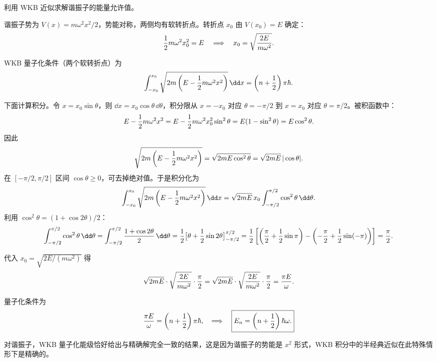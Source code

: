 \begin{question}
利用 WKB 近似求解谐振子的能量允许值。
\end{question}
\begin{solution}
谐振子势为 $V(x)=m\omega^2x^2/2$，势能对称，两侧均有软转折点。转折点 $x_0$ 由 $V(x_0)=E$ 确定：
\[
{1\over2}m\omega^2x_0^2=E\quad\Longrightarrow\quad
x_0=\sqrt{2E\over m\omega^2}.
\]

WKB 量子化条件（两个软转折点）为
\[
\int_{-x_0}^{x_0}\sqrt{2m\left(E-{1\over2}m\omega^2x^2\right)}\,\dd x
=\left(n+{1\over2}\right)\pi\hbar.
\]

下面计算积分。令 $x=x_0\sin\theta$，则 $\dd x=x_0\cos\theta\,\dd\theta$，积分限从 $x=-x_0$ 对应 $\theta=-\pi/2$ 到 $x=x_0$ 对应 $\theta=\pi/2$。被积函数中：
\[
E-{1\over2}m\omega^2x^2
=E-{1\over2}m\omega^2x_0^2\sin^2\theta
=E(1-\sin^2\theta)=E\cos^2\theta.
\]
因此
\[
\sqrt{2m\left(E-{1\over2}m\omega^2x^2\right)}
=\sqrt{2mE\cos^2\theta}=\sqrt{2mE}\,|\cos\theta|.
\]
在 $[-\pi/2,\pi/2]$ 区间 $\cos\theta\ge0$，可去掉绝对值。于是积分化为
\[
\int_{-x_0}^{x_0}\sqrt{2m\left(E-{1\over2}m\omega^2x^2\right)}\,\dd x
=\sqrt{2mE}\,x_0\int_{-\pi/2}^{\pi/2}\cos^2\theta\,\dd\theta.
\]
利用 $\cos^2\theta=(1+\cos2\theta)/2$：
\[
\int_{-\pi/2}^{\pi/2}\cos^2\theta\,\dd\theta
=\int_{-\pi/2}^{\pi/2}{1+\cos2\theta\over2}\,\dd\theta
={1\over2}\bigl[\theta+{1\over2}\sin2\theta\bigr]_{-\pi/2}^{\pi/2}
={1\over2}\left[\left({\pi\over2}+{1\over2}\sin\pi\right)
-\left(-{\pi\over2}+{1\over2}\sin(-\pi)\right)\right]
={\pi\over2}.
\]

代入 $x_0=\sqrt{2E/(m\omega^2)}$ 得
\[
\sqrt{2mE}\cdot\sqrt{2E\over m\omega^2}\cdot{\pi\over2}
=\sqrt{2mE}\cdot\sqrt{2E\over m\omega^2}\cdot{\pi\over2}
={\pi E\over\omega}.
\]

量子化条件为
\[
{\pi E\over\omega}=\left(n+{1\over2}\right)\pi\hbar,
\quad\Longrightarrow\quad
\boxed{E_n=\left(n+{1\over2}\right)\hbar\omega.}
\]

对谐振子，WKB 量子化能级恰好给出与精确解完全一致的结果，这是因为谐振子的势能是 $x^2$ 形式，WKB 积分中的半经典近似在此特殊情形下是精确的。
\end{solution}

